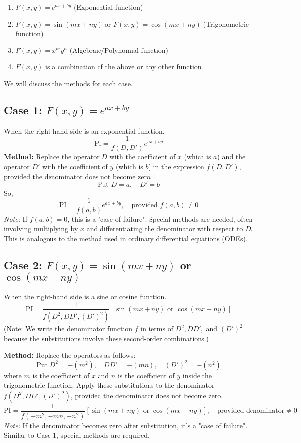 \documentclass{article}
\theoremstyle{remark}
\begin{document}
	\begin{enumerate}
		\item $F(x, y) = e^{ax + by}$ (Exponential function)
		\item $F(x, y) = \sin(mx + ny)$ or $F(x, y) = \cos(mx + ny)$ (Trigonometric function)
		\item $F(x, y) = x^m y^n$ (Algebraic/Polynomial function)
		\item $F(x, y)$ is a combination of the above or any other function.
	\end{enumerate}
	
	We will discuss the methods for each case.
	
	\subsection{Case 1: $F(x, y) = e^{ax+by}$}
	When the right-hand side is an exponential function.
	\[
	\text{PI} = \frac{1}{f(D, D')} e^{ax+by}
	\]
	\textbf{Method:} Replace the operator $D$ with the coefficient of $x$ (which is $a$) and the operator $D'$ with the coefficient of $y$ (which is $b$) in the expression $f(D, D')$, provided the denominator does not become zero.
	\[
	\text{Put } D = a, \quad D' = b
	\]
	So,
	\[
	\text{PI} = \frac{1}{f(a, b)} e^{ax+by}, \quad \text{provided } f(a, b) \neq 0
	\]
	\textit{Note:} If $f(a, b) = 0$, this is a "case of failure". Special methods are needed, often involving multiplying by $x$ and differentiating the denominator with respect to $D$. This is analogous to the method used in ordinary differential equations (ODEs).
	
	\subsection{Case 2: $F(x, y) = \sin(mx+ny)$ or $\cos(mx+ny)$}
	When the right-hand side is a sine or cosine function.
	\[
	\text{PI} = \frac{1}{f(D^2, DD', (D')^2)} [\sin(mx+ny) \text{ or } \cos(mx+ny)]
	\]
	(Note: We write the denominator function $f$ in terms of $D^2, DD',$ and $(D')^2$ because the substitutions involve these second-order combinations.)
	
	\textbf{Method:} Replace the operators as follows:
	\[
	\text{Put } D^2 = -(m^2), \quad DD' = -(mn), \quad (D')^2 = -(n^2)
	\]
	where $m$ is the coefficient of $x$ and $n$ is the coefficient of $y$ inside the trigonometric function. Apply these substitutions to the denominator $f(D^2, DD', (D')^2)$, provided the denominator does not become zero.
	\[
	\text{PI} = \frac{1}{f(-m^2, -mn, -n^2)} [\sin(mx+ny) \text{ or } \cos(mx+ny)], \quad \text{provided denominator} \neq 0
	\]
	\textit{Note:} If the denominator becomes zero after substitution, it's a "case of failure". Similar to Case 1, special methods are required.
	
\end{document}
